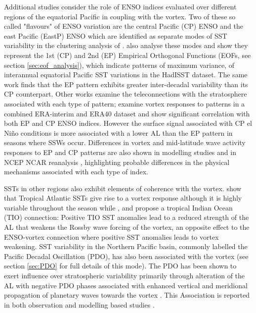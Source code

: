 Additional studies consider the role of ENSO indices evaluated over different regions of the equatorial Pacific in coupling with the vortex. Two of these so called  "flavours" of ENSO variation are the central Pacific (CP) ENSO and the east Pacific (EastP) ENSO which are identified as separate modes of SST variability in the clustering analysis of \cite{johnsonHow2013f}. \cite{kaoContrasting2009d} also analyse these modes and show they represent the 1st (CP) and 2nd (EP) Empirical Orthogonal Functions (EOFs, see section \ref{sec:eof_analysis}), which indicate patterns of maximum variance, of interannual equatorial Pacific SST variations in the HadISST dataset. The same work finds that the EP pattern exhibits greater inter-decadal variability than its CP counterpart. Other works examine the teleconnections with the stratosphere associated with each type of pattern; \cite{izaRole2015b} examine vortex responses to patterns in a combined ERA-interim and ERA40 dataset and show significant correlation with both EP and CP ENSO indices. However the surface signal associated with CP el Ni\~{n}o conditions is more associated with a lower AL than the EP pattern in seasons where SSWs occur. Differences in vortex and mid-latitude wave activity responses to EP and CP patterns are also shown in modelling studies \citep{hegyiDynamical2011b} and in NCEP NCAR reanalysis \citep{sungAltered2014b}, highlighting probable differences in the physical mechanisms associated with each type of index. 

SSTs in other regions also exhibit elements of coherence with the vortex. \cite{raoVarying2018d} show that Tropical Atlantic SSTs give rise to a vortex response although it is highly variable throughout the season while \cite{fletcherRole2011b}, \cite{fletcherLinear2013b} and \cite{raoDecomposition2016b} propose a tropical Indian Ocean (TIO) connection: Positive TIO SST anomalies lead to a reduced strength of the AL that weakens the Rossby wave forcing of the vortex, an opposite effect to the ENSO-vortex connection where positive SST anomalies leads to vortex weakening. SST variability in the Northern Pacific basin, commonly labelled the Pacific Decadal Oscillation (PDO), has also been associated with the vortex (see section \ref{sec:PDO} for full details of this mode). The PDO has been shown to exert influence over stratospheric variability primarily through alteration of the AL with negative PDO phases associated with enhanced vertical and meridional propagation of planetary waves towards the vortex \citep{mantuaPacific1997a, rodionovSpatial2005b,raoModulation2019d}. This Association is reported in both observation and modelling based studies \citep{garcia-herreraPropagation2006b, krenWintertime2016b, huDecadal2018b}.


